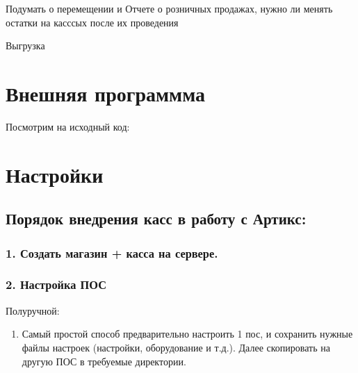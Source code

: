 \documentclass[twoside,11pt,a4paper,notitlepage]{report}
\begin{document}
Подумать о перемещении и Отчете о розничных продажах, нужно ли менять остатки на касссых после их проведения


Выгрузка





\chapter{Внешняя программма}
\label{\detokenize{prox:id1}}\label{\detokenize{prox::doc}}

Посмотрим на исходный код:


%

\sphinxresetverbatimhllines




\chapter{Настройки}
\label{\detokenize{setting:id1}}\label{\detokenize{setting::doc}}



\section{Порядок внедрения касс в работу с Артикс:}
\label{\detokenize{kass:id1}}\label{\detokenize{kass::doc}}

\subsection{1. Создать магазин + касса на сервере.}
\label{\detokenize{kass:id2}}


\subsection{2. Настройка ПОС}
\label{\detokenize{kass:id3}}
\sphinxAtStartPar
Полуручной:
\begin{enumerate}
%
\item {} 
\sphinxAtStartPar
Самый простой способ предварительно настроить 1 пос, и сохранить нужные файлы настроек (настройки, оборудование и т.д.). Далее скопировать на другую ПОС в требуемые директории.

\end{enumerate}
\end{document}
